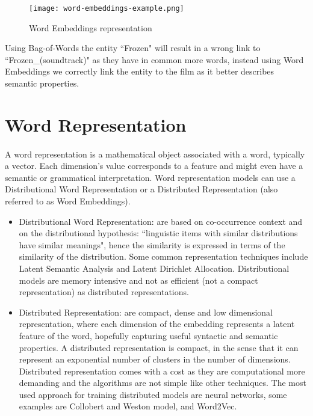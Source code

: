 \pagebreak

\vspace{-10pt}
\begin{figure}[h!]
\texttt{[image: word-embeddings-example.png]}
\caption{Word Embeddings representation}
\label{fig:word_embedding_similarity}
\end{figure}
\vspace{-10pt}

Using Bag-of-Words the entity ``Frozen" will result in a wrong link to ``Frozen\_(soundtrack)" as they have in common more words, instead using Word Embeddings we correctly link the entity to the film as it better describes semantic properties.

\nocite{sebastianruder}
\nocite{turian2010word}
\nocite{mccormick2017skipgram}
\nocite{Thalhammer2016}
\section{Word Representation}
\paragraph{}
A word representation is a mathematical object associated with a word, typically a vector. Each dimension’s value corresponds to a feature and might even have a semantic or grammatical interpretation. Word representation models can use a Distributional Word Representation or a Distributed Representation (also referred to as Word Embeddings).

\begin{itemize}[itemsep = 0.1em]
\item Distributional Word Representation: are based on co-occurrence context and on the distributional hypothesis:  ``linguistic items with similar distributions have similar meanings", hence the similarity is expressed in terms of the similarity of the distribution. Some common representation techniques include Latent Semantic Analysis and Latent Dirichlet Allocation. Distributional models are memory intensive and not as efficient (not a compact representation) as distributed representations.

\item Distributed Representation: are compact, dense and low dimensional representation, where each dimension of the embedding represents a latent feature of the word, hopefully capturing useful syntactic and semantic properties. A distributed representation is compact, in the sense that it can represent an exponential number of clusters in the number of dimensions. Distributed representation comes with a cost as they are computational more demanding and the algorithms are not simple like other techniques. The most used approach for training distributed models are neural networks, some examples are Collobert and Weston model, and Word2Vec.
\end{itemize}


